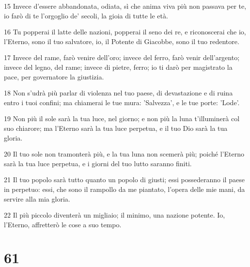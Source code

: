 \par 15 Invece d'essere abbandonata, odiata, sì che anima viva più non passava per te, io farò di te l'orgoglio de' secoli, la gioia di tutte le età.
\par 16 Tu popperai il latte delle nazioni, popperai il seno dei re, e riconoscerai che io, l'Eterno, sono il tuo salvatore, io, il Potente di Giacobbe, sono il tuo redentore.
\par 17 Invece del rame, farò venire dell'oro; invece del ferro, farò venir dell'argento; invece del legno, del rame; invece di pietre, ferro; io ti darò per magistrato la pace, per governatore la giustizia.
\par 18 Non s'udrà più parlar di violenza nel tuo paese, di devastazione e di ruina entro i tuoi confini; ma chiamerai le tue mura: 'Salvezza', e le tue porte: 'Lode'.
\par 19 Non più il sole sarà la tua luce, nel giorno; e non più la luna t'illuminerà col suo chiarore; ma l'Eterno sarà la tua luce perpetua, e il tuo Dio sarà la tua gloria.
\par 20 Il tuo sole non tramonterà più, e la tua luna non scemerà più; poiché l'Eterno sarà la tua luce perpetua, e i giorni del tuo lutto saranno finiti.
\par 21 Il tuo popolo sarà tutto quanto un popolo di giusti; essi possederanno il paese in perpetuo: essi, che sono il rampollo da me piantato, l'opera delle mie mani, da servire alla mia gloria.
\par 22 Il più piccolo diventerà un migliaio; il minimo, una nazione potente. Io, l'Eterno, affretterò le cose a suo tempo.

\chapter{61}

